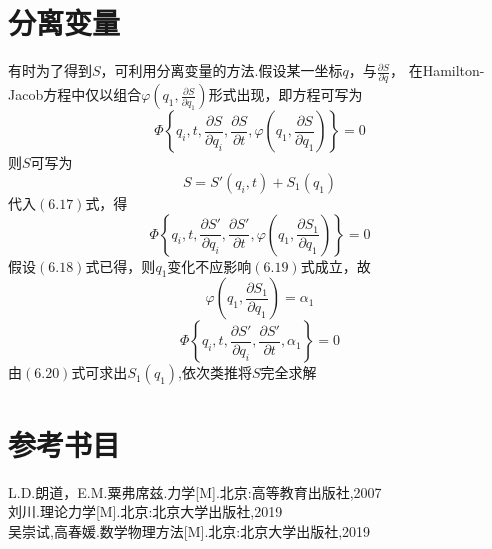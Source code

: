 \section{分离变量}
有时为了得到$S$，可利用分离变量的方法.假设某一坐标$q$，与$\displaystyle{\frac{\partial S}{\partial q}}$，
在Hamilton-Jacob方程中仅以组合$\displaystyle{\varphi(q_1,\frac{\partial S}{\partial q_1})}$形式出现，即方程可写为
\begin{equation}
    \varPhi\left\{q_i,t,\frac{\partial S}{\partial q_i},\frac{\partial S}{\partial t},
    \varphi\left(q_1,\frac{\partial S}{\partial q_1}\right)\right\}=0
\end{equation}
则$S$可写为
\begin{equation}
    S=S'(q_i,t)+S_1(q_1)
\end{equation}
代入$(6.17)$式，得
\begin{equation}
    \varPhi\left\{q_i,t,\frac{\partial S'}{\partial q_i},\frac{\partial S'}{\partial t},
    \varphi\left(q_1,\frac{\partial S_1}{\partial q_1}\right)\right\}=0
\end{equation}
假设$(6.18)$式已得，则$q_1$变化不应影响$(6.19)$式成立，故
\begin{equation}
    \varphi\left(q_1,\frac{\partial S_1}{\partial q_1}\right)=\alpha_1
\end{equation}
\begin{equation}
    \varPhi\left\{q_i,t,\frac{\partial S'}{\partial q_i},\frac{\partial S'}{\partial t},\alpha_1\right\}=0
\end{equation}
由$(6.20)$式可求出$S_1(q_1)$,依次类推将$S$完全求解
\newpage
\section*{参考书目}
\noindent
[1]\;L.D.朗道，E.M.粟弗席兹.力学[M].北京:高等教育出版社,2007\\\relax
[2]刘川.理论力学[M].北京:北京大学出版社,2019 \\\relax
[3]吴崇试,高春媛.数学物理方法[M].北京:北京大学出版社,2019
